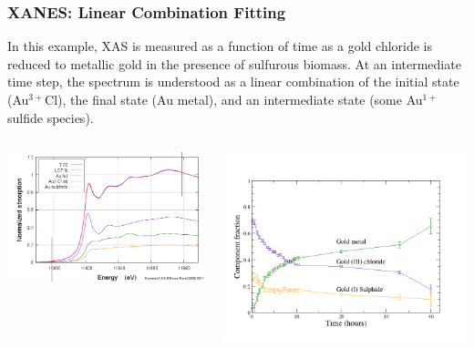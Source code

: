 \documentclass[10pt, xcolor=x11names, compress]{beamer}
\begin{document}
\begin{frame}
  \frametitle{XANES: Linear Combination Fitting}
  In this example, XAS is measured as a function of time as a gold
  chloride is reduced to metallic gold in the presence of sulfurous
  biomass.  At an intermediate time step, the spectrum is understood
  as a linear combination of the initial state
  ({\color{Green4}Au$^{3+}$Cl}), the final state ({\color{Purple4}Au
    metal}), and an intermediate state ({\color{Orange2}some Au$^{1+}$
    sulfide species}).
  \begin{columns}
    \begin{column}{0.5\linewidth}
      \includegraphics[width=\linewidth]{../iiss/xas/aucl_lcf.png}
    \end{column}
    \begin{column}{0.5\linewidth}
      \includegraphics[width=\linewidth]{../iiss/xas/aucl_results.png}

\end{column}
\end{columns}
\end{frame}
\end{document}
